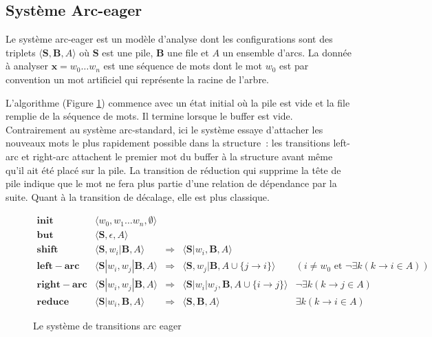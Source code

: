 \documentclass[11pt,openany]{book}
\begin{document}
\subsection{Système Arc-eager}

Le système arc-eager est un modèle d'analyse dont les configurations
sont des triplets $\langle \mathbf{S},\mathbf{B} ,  A\rangle$ où
$\mathbf{S}$ est une pile, $\mathbf{B}$ une file et $A$ un ensemble d'arcs.
La donnée à analyser $\mathbf{x} = w_0\ldots w_n$ est une séquence de mots
dont le mot $w_0$ est par convention un mot artificiel qui représente
la racine de l'arbre.

L'algorithme (Figure \ref{fig-AE}) commence avec un état initial où la
pile est vide et la file remplie de la séquence de mots. Il termine
lorsque le buffer est vide. Contrairement au système arc-standard, ici
le système essaye d'attacher les nouveaux mots le plus rapidement possible dans
la structure~: les transitions left-arc et right-arc attachent le
premier mot du buffer à la structure avant même qu'il ait été placé
sur la pile. La transition de réduction qui supprime la tête de pile
indique que le mot ne fera plus partie d'une relation de dépendance
par la suite.  Quant à la transition de décalage, elle est plus classique. 
\begin{figure}[htbp]
\begin{displaymath}
\begin{array}{rccll}
\mathbf{init}  &\langle w_0 ,  w_1 \ldots w_n ,\emptyset \rangle\\
\mathbf{but}  & \langle \mathbf{S} ,\epsilon , A \rangle\\
\mathbf{shift} & \langle \mathbf{S} ,  w_i | \mathbf{B} , A   \rangle
&\Rightarrow &\langle \mathbf{S} | w_i ,  \mathbf{B} , A   \rangle\\
\mathbf{left-arc} &\langle \mathbf{S}| w_i , w_j|\mathbf{B} , A
\rangle &\Rightarrow& \langle \mathbf{S}, w_j | \mathbf{B} , A \cup \{
j\rightarrow i \}   \rangle & (i\not = w_0 \text{ et } \lnot \exists k
(k\rightarrow i \in A) )\\
\mathbf{right-arc }  &\langle \mathbf{S}|w_i , w_j | \mathbf{B} , A   \rangle
&\Rightarrow & 
\langle \mathbf{S}| w_i | w_j , \mathbf{B} , A \cup \{
i \rightarrow j \}   \rangle
&\lnot\exists k (k\rightarrow j \in A)\\
\mathbf{reduce}&\langle \mathbf{S}|w_i , \mathbf{B} , A   \rangle
&\Rightarrow & 
\langle \mathbf{S} , \mathbf{B} , A   \rangle & 
\exists k (k\rightarrow i \in A)
\end{array}
\end{displaymath}
\caption{\label{fig-AE}Le système de transitions arc eager}
\end{figure}
\end{document}
